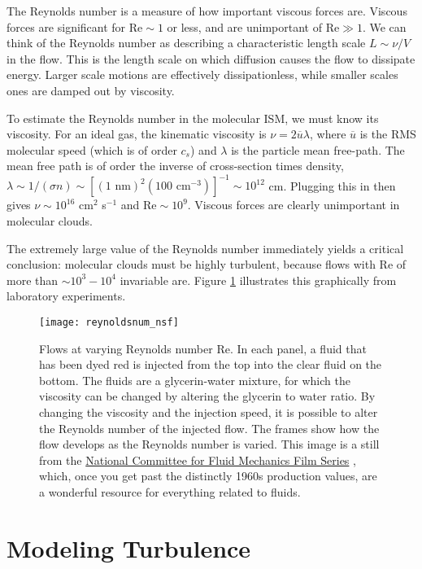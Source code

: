 The Reynolds number is a measure of how important viscous forces are. Viscous forces are significant for $\mathrm{Re} \sim 1$ or less, and are unimportant of $\mathrm{Re} \gg 1$. We can think of the Reynolds number as describing a characteristic length scale $L\sim \nu/V$ in the flow. This is the length scale on which diffusion causes the flow to dissipate energy. Larger scale motions are effectively dissipationless, while smaller scales ones are damped out by viscosity.

To estimate the Reynolds number in the molecular ISM, we must know its viscosity. For an ideal gas, the kinematic viscosity is $\nu=2\overline{u}\lambda$, where $\overline{u}$ is the RMS molecular speed (which is of order $c_s$) and $\lambda$ is the particle mean free-path. The mean free path is of order the inverse of cross-section times density, $\lambda \sim 1/(\sigma n) \sim [(1\mbox{ nm})^2 (100\mbox { cm}^{-3})]^{-1}\sim 10^{12}$ cm. Plugging this in then gives 
$\nu \sim 10^{16}$ cm$^2$ s$^{-1}$ and $\mathrm{Re} \sim 10^9$. Viscous forces are clearly unimportant in molecular clouds.

The extremely large value of the Reynolds number immediately yields a critical conclusion: molecular clouds must be highly turbulent, because flows with $\mathrm{Re}$ of more than $\sim 10^3-10^4$ invariable are. Figure \ref{fig:reynoldsnum_nsf} illustrates this graphically from laboratory experiments.

\begin{figure}
\texttt{[image: reynoldsnum\_nsf]}
\caption[Comparison of flows at varying Reynolds numbers]{
\label{fig:reynoldsnum_nsf}
Flows at varying Reynolds number Re. In each panel, a fluid that has been dyed red is injected from the top into the clear fluid on the bottom. The fluids are a glycerin-water mixture, for which the viscosity can be changed by altering the glycerin to water ratio. By changing the viscosity and the injection speed, it is possible to alter the Reynolds number of the injected flow. The frames show how the flow develops as the Reynolds number is varied. This image is a still from the \href{https://www.youtube.com/playlist?list=PL0EC6527BE871ABA3}{National Committee for Fluid Mechanics Film Series}  \citep{taylor64a}, which, once you get past the distinctly 1960s production values, are a wonderful resource for everything related to fluids.
}
\end{figure}

\section{Modeling Turbulence}


